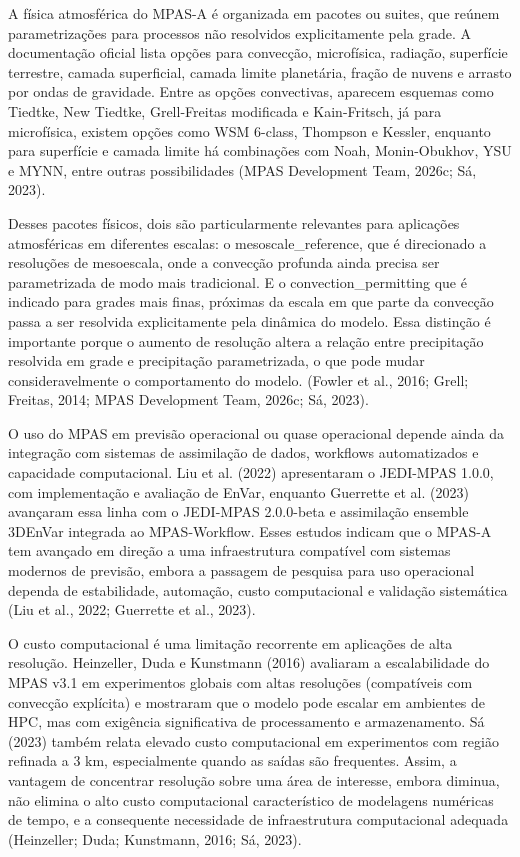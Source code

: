 \documentclass[12pt,a4paper,oneside]{book}
\begin{document}
A física atmosférica do MPAS-A é organizada em pacotes ou suites, que reúnem parametrizações para processos não resolvidos explicitamente pela grade. A documentação oficial lista opções para convecção, microfísica, radiação, superfície terrestre, camada superficial, camada limite planetária, fração de nuvens e arrasto por ondas de gravidade. Entre as opções convectivas, aparecem esquemas como Tiedtke, New Tiedtke, Grell-Freitas modificada e Kain-Fritsch, já para microfísica, existem opções como WSM 6-class, Thompson e Kessler, enquanto para superfície e camada limite há combinações com Noah, Monin-Obukhov, YSU e MYNN, entre outras possibilidades (MPAS Development Team, 2026c; Sá, 2023).

Desses pacotes físicos, dois são particularmente relevantes para aplicações atmosféricas em diferentes escalas: o mesoscale\_reference, que é direcionado a resoluções de mesoescala, onde a convecção profunda ainda precisa ser parametrizada de modo mais tradicional. E o convection\_permitting que é indicado para grades mais finas, próximas da escala em que parte da convecção passa a ser resolvida explicitamente pela dinâmica do modelo. Essa distinção é importante porque o aumento de resolução altera a relação entre precipitação resolvida em grade e precipitação parametrizada, o que pode mudar consideravelmente o comportamento do modelo. (Fowler et al., 2016; Grell; Freitas, 2014; MPAS Development Team, 2026c; Sá, 2023).

O uso do MPAS em previsão operacional ou quase operacional depende ainda da integração com sistemas de assimilação de dados, workflows automatizados e capacidade computacional. Liu et al. (2022) apresentaram o JEDI-MPAS 1.0.0, com implementação e avaliação de EnVar, enquanto Guerrette et al. (2023) avançaram essa linha com o JEDI-MPAS 2.0.0-beta e assimilação ensemble 3DEnVar integrada ao MPAS-Workflow. Esses estudos indicam que o MPAS-A tem avançado em direção a uma infraestrutura compatível com sistemas modernos de previsão, embora a passagem de pesquisa para uso operacional dependa de estabilidade, automação, custo computacional e validação sistemática (Liu et al., 2022; Guerrette et al., 2023).

O custo computacional é uma limitação recorrente em aplicações de alta resolução. Heinzeller, Duda e Kunstmann (2016) avaliaram a escalabilidade do MPAS v3.1 em experimentos globais com altas resoluções (compatíveis com convecção explícita) e mostraram que o modelo pode escalar em ambientes de HPC, mas com exigência significativa de processamento e armazenamento. Sá (2023) também relata elevado custo computacional em experimentos com região refinada a 3 km, especialmente quando as saídas são frequentes. Assim, a vantagem de concentrar resolução sobre uma área de interesse, embora diminua, não elimina o alto custo computacional característico de modelagens numéricas de tempo, e a consequente necessidade de infraestrutura computacional adequada (Heinzeller; Duda; Kunstmann, 2016; Sá, 2023).
\end{document}
